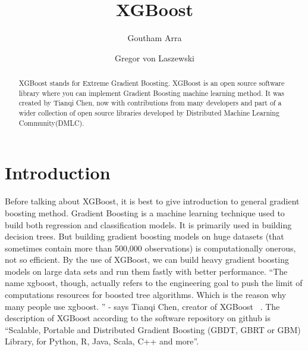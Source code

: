 
\title{XGBoost}


\author{Goutham Arra}

\author{Gregor von Laszewski}




\begin{abstract} 
XGBoost stands for Extreme Gradient Boosting. XGBoost is an
open source software library where you can  implement Gradient Boosting machine
learning method. It was created by Tianqi Chen, now with contributions from many
developers and part of a wider collection of open source libraries developed by
Distributed Machine Learning Community(DMLC).
\end{abstract}



\maketitle


\section{Introduction}  

Before talking about XGBoost, it is best to give introduction to general
gradient boosting method. Gradient Boosting is a machine learning technique used
to build both regression and classification models. It is primarily used in
building decision trees. But building gradient boosting models on huge datasets
(that sometimes contain more than 500,000 observations) is computationally
onerous, not so efficient. By the use of XGBoost, we can build  heavy gradient
boosting models on large data sets and run them fastly with better performance.
``The name xgboost, though, actually refers to the engineering goal to push the
limit of computations resources for boosted tree algorithms. Which is the reason
why many people use xgboost. '' - says Tianqi Chen, creator of XGBoost ~\cite
{hid-sp18-401-XGBoost-MLmastery}. The description of XGBoost according to the
software repository on github is ``Scalable, Portable and Distributed Gradient
Boosting (GBDT, GBRT or GBM) Library, for Python, R, Java, Scala, C++ and more''.



